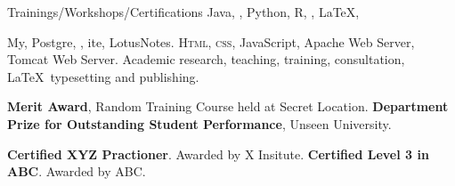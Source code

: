 
\begin{rubric}{Trainings/Workshops/Certifications}
	Java, , Python, R, , \LaTeX,
 
\entry*[Databases]
	My, Postgre, , ite, LotusNotes.
	\textsc{Html, css}, JavaScript, Apache Web Server, Tomcat Web Server.
\entry*[Misc.]
	Academic research, teaching, training, consultation, \LaTeX\ typesetting and publishing.

    \entry*[2002] \textbf{Merit Award}, Random Training Course held at Secret Location.
%
    \entry*[2001] \textbf{Department Prize for Outstanding Student Performance}, Unseen University.

    \entry*[2014] \textbf{Certified XYZ Practioner}. Awarded by X Insitute.
    \entry*[2006] \textbf{Certified Level 3 in ABC}. Awarded by ABC.
 
\end{rubric}
